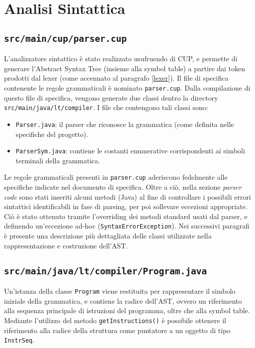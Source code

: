 \documentclass[hidelinks,10pt,a4paper]{article}
\begin{document}
\pagebreak

\section{Analisi Sintattica} \label{analisiSintattica}

\subsection{\texttt{src/main/cup/parser.cup}}
L'analizzatore sintattico è stato realizzato usufruendo di CUP, e permette di generare l'Abstract Syntax Tree (insieme alla symbol table) a partire dai token prodotti dal lexer (come accennato al paragrafo \ref{lexer}).
Il file di specifica contenente le regole grammaticali è nominato \texttt{parser.cup}.
Dalla compilazione di questo file di specifica, vengono generate due classi dentro la directory \texttt{src/main/java/lt/compiler}.
I file che contengono tali classi sono:
\begin{itemize}
    \item \texttt{Parser.java}: il parser che riconosce la grammatica (come definita nelle specifiche del progetto).
    \item \texttt{ParserSym.java}: contiene le costanti enumerative corrispondenti ai simboli terminali della grammatica.
\end{itemize}
Le regole grammaticali presenti in \texttt{parser.cup} aderiscono fedelmente alle specifiche indicate nel documento di specifica.
Oltre a ciò, nella sezione \textit{parser code} sono stati inseriti alcuni metodi (Java) al fine di controllare i possibili errori sintattici identificabili in fase di parsing, per poi sollevare eccezioni appropriate.
Ciò è stato ottenuto tramite l'overriding dei metodi standard usati dal parser, e definendo un'eccezione ad-hoc (\texttt{SyntaxErrorException}).
Nei successivi paragrafi è presente una descrizione più dettagliata delle classi utilizzate nella rappresentazione e costruzione dell'AST.

\subsection{\texttt{src/main/java/lt/compiler/Program.java}}
Un'istanza della classe \texttt{Program} viene restituita per rappresentare il simbolo iniziale della grammatica, e contiene la radice dell'AST, ovvero un riferimento alla sequenza principale di istruzioni del programma, oltre che alla symbol table.
Mediante l'utilizzo del metodo \texttt{getInstructions()} è possibile ottenere il riferimento alla radice della struttura come puntatore a un oggetto di tipo \texttt{InstrSeq}.
\end{document}
